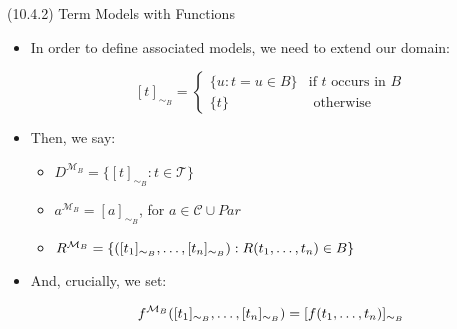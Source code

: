 \documentclass[../slides.tex]{subfiles}
\begin{document}
\begin{frame}{(10.4.2) Term Models with Functions}

	\begin{itemize}
	
		\item In order to define associated models, we need to extend our domain:
		
		 \[[t]_{\sim_B}=\begin{cases} \{u:t=u\in B\} &\text{if }t\text{ occurs in }B\\
	\{t\} &\text{ otherwise}\end{cases}\]
	
		\item Then, we say:
		\begin{itemize}
		
			\item $D^{\mathcal{M}_B}=\{[t]_{\sim_B}:t\in\mathcal{T}\}$
			
			\item $a^{\mathcal{M}_B}=[a]_{\sim_B}$, for $a\in \mathcal{C}\cup Par$
			
			\item $R^{\mathcal{M}_B}=\{([t_1]_{\sim_B}, \mathellipsis, [t_n]_{\sim_B}): R(t_1, \mathellipsis, t_n)\in B\}$

		\end{itemize}
		
		\item And, crucially, we set:
		
		\[f^{\mathcal{M}_B}([t_1]_{\sim_B},\mathellipsis, [t_n]_{\sim_B})=[f(t_1, \mathellipsis, t_n)]_{\sim_B}\]
		
	\end{itemize}

\end{frame}
\end{document}
